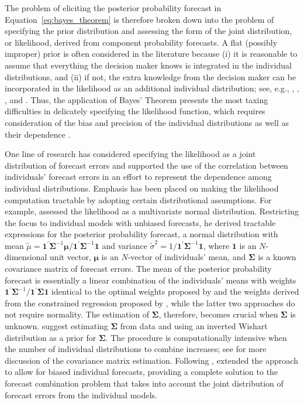 \documentclass[11pt]{article}
\begin{document}
The problem of eliciting the posterior probability forecast in Equation~\eqref{eq:bayes_theorem} is therefore broken down into the problem of specifying the prior distribution and assessing the form of the joint distribution, or likelihood, derived from component probability forecasts. A flat (possibly improper) prior is often considered in the literature because (i) it is reasonable to assume that everything the decision maker knows is integrated in the individual distributions, and (ii) if not, the extra knowledge from the decision maker can be incorporated in the likelihood as an additional individual distribution; see, e.g., \cite{Winkler1968-uw}, \cite{Clemen1993-ty}, \cite{Clemen1985-kx}, and \cite{Jouini1996-fe}. Thus, the application of Bayes' Theorem presents the most taxing difficulties in delicately specifying the likelihood function, which requires consideration of the bias and precision of the individual distributions as well as their dependence \citep{Hall2004-tm}.

One line of research has considered specifying the likelihood as a joint distribution of forecast errors and supported the use of the correlation between individuals' forecast errors in an effort to represent the dependence among individual distributions. Emphasis has been placed on making the likelihood computation tractable by adopting certain distributional assumptions. For example, \cite{Winkler1981-bn} assessed the likelihood as a multivariate normal distribution. Restricting the focus to individual models with unbiased forecasts, he derived tractable expressions for the posterior probability forecast, a normal distribution with mean $\tilde{\mu} = \mathbf{1}^{\prime} \boldsymbol{\Sigma}^{-1} \boldsymbol{\mu} / \mathbf{1}^{\prime} \boldsymbol{\Sigma}^{-1} \mathbf{1}$ and variance $\tilde{\sigma}^{2} = 1/\mathbf{1}^{\prime} \boldsymbol{\Sigma}^{-1} \mathbf{1}$, where $\mathbf{1}$ is an $N$-dimensional unit vector, $\boldsymbol{\mu}$ is an $N$-vector of individuals' mean, and $\boldsymbol{\Sigma}$ is a known covariance matrix of forecast errors. The mean of the posterior probability forecast is essentially a linear combination of the individuals' means with weights $\mathbf{1}^{\prime} \boldsymbol{\Sigma}^{-1} / \mathbf{1}^{\prime} \boldsymbol{\Sigma} \mathbf{1}$ identical to the optimal weights proposed by \cite{Bates1969-yj} and the weights derived from the constrained regression proposed by \cite{Granger1984-jc}, while the latter two approaches do not require normality. The estimation of $\boldsymbol{\Sigma}$, therefore, becomes crucial when $\boldsymbol{\Sigma}$ is unknown. \cite{Winkler1981-bn} suggest estimating $\boldsymbol{\Sigma}$ from data and using an inverted Wishart distribution as a prior for $\boldsymbol{\Sigma}$. The procedure is computationally intensive when the number of individual distributions to combine increases; see \cite{Hall2004-tm} for more discussion of the covariance matrix estimation. Following \cite{Winkler1981-bn}, \cite{Palm1992-im} extended the approach to allow for biased individual forecasts, providing a complete solution to the forecast combination problem that takes into account the joint distribution of forecast errors from the individual models.
\end{document}
